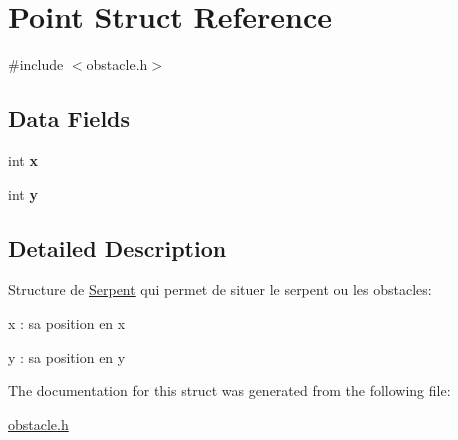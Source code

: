 \hypertarget{struct_point}{}\section{Point Struct Reference}
\label{struct_point}


{\ttfamily \#include $<$obstacle.\+h$>$}

\subsection*{Data Fields}
\begin{DoxyCompactItemize}
\item 
\hypertarget{struct_point_a6150e0515f7202e2fb518f7206ed97dc}{}int {\bfseries x}\label{struct_point_a6150e0515f7202e2fb518f7206ed97dc}

\item 
\hypertarget{struct_point_a0a2f84ed7838f07779ae24c5a9086d33}{}int {\bfseries y}\label{struct_point_a0a2f84ed7838f07779ae24c5a9086d33}

\end{DoxyCompactItemize}


\subsection{Detailed Description}
Structure de \hyperlink{struct_serpent}{Serpent} qui permet de situer le serpent ou les obstacles\+:
\begin{DoxyItemize}
\item x \+: sa position en x
\item y \+: sa position en y 
\end{DoxyItemize}

The documentation for this struct was generated from the following file\+:\begin{DoxyCompactItemize}
\item 
\hyperlink{obstacle_8h}{obstacle.\+h}\end{DoxyCompactItemize}

